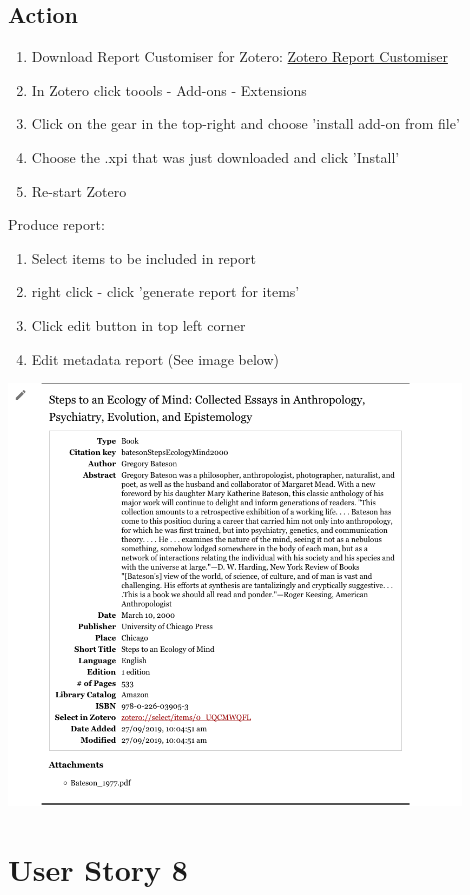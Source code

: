\documentclass{article}
\begin{document}
\subsection{Action}
\begin{enumerate}
    \item Download Report Customiser for Zotero: \href{https://github.com/retorquere/zotero-report-customizer}{Zotero Report Customiser}
    \item In Zotero click toools - Add-ons - Extensions
    \item Click on the gear in the top-right and choose 'install add-on from file'
    \item Choose the .xpi that was just downloaded and click 'Install'
    \item Re-start Zotero
\end{enumerate}
Produce report:
\begin{enumerate}
    \item Select items to be included in report
    \item right click - click 'generate report for items' 
    \item Click edit button in top left corner 
    \item Edit metadata report (See image below)
\end{enumerate}
\includegraphics[width=12cm]{metadata.png}

\section{User Story 8}
\end{document}

